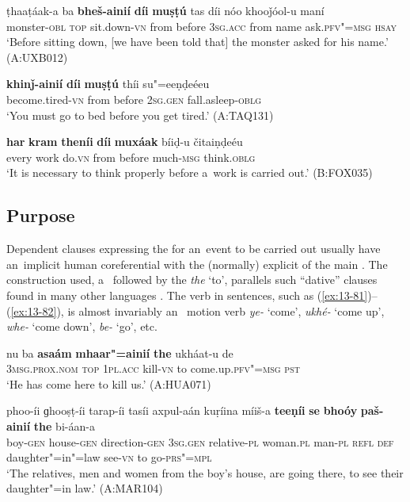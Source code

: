\ea
\label{ex:13-78}
\gll ṭhaaṭáak-a ba \textbf{bheš-ainií} \textbf{díi} \textbf{muṣṭú} tas díi nóo khooǰóol-u maní \\
monster-\textsc{obl} \textsc{top} sit.down-\textsc{vn} from before \textsc{3sg.acc} from name ask.\textsc{pfv"=msg} \textsc{hsay} \\
\glt `Before sitting down, [we have been told that] the monster asked for his name.' (A:UXB012)

\ex
\label{ex:13-79}
\gll \textbf{khinǰ-ainií} \textbf{díi} \textbf{muṣṭú} thíi su"=eeṇḍeéeu  \\
become.tired-\textsc{vn} from before \textsc{2sg.gen} fall.asleep-\textsc{oblg} \\
\glt `You must go to bed before you get tired.' (A:TAQ131)

\ex
\label{ex:13-80}
\gll \textbf{har} \textbf{kram} \textbf{theníi} \textbf{díi} \textbf{muxáak} bíiḍ-u čitaiṇḍeéu  \\
every work do.\textsc{vn} from before much-\textsc{msg} think.\textsc{oblg} \\
\glt `It is necessary to think properly before a~work is carried out.' (B:FOX035)
\z

\subsection{Purpose}
\label{subsec:13-4-2}

Dependent clauses expressing the  for an~event to be carried out usually have an~implicit human  coreferential with the (normally) explicit  of the main  \citep[337]{givon2001b}. The construction used, a~ followed by the  \textit{the} `to', parallels such ``dative''  clauses found in many other languages \citep[251--252]{thompsonetal2007}. The  verb in sentences, such as (\ref{ex:13-81})--(\ref{ex:13-82}), is almost invariably an~ motion verb \textit{ye-} `come', \textit{ukhé-} `come up', \textit{whe-} `come down', \textit{be-} `go', etc.

\begin{exe}
\ex
\label{ex:13-81}
\gll nu ba \textbf{asaám} \textbf{mhaar"=ainií} \textbf{the} ukháat-u de\\
\textsc{3msg.prox.nom} \textsc{top} \textsc{1pl.acc} kill-\textsc{vn} to come.up.\textsc{pfv"=msg} \textsc{pst}\\
\glt `He has come here to kill us.' (A:HUA071)

\ex
\label{ex:13-82}
\gll phoo-íi ɡhooṣṭ-íi tarap-íi tasíi axpul-aán kuṛíina míiš-a \textbf{teeṇíi} \textbf{se} \textbf{bhoóy} \textbf{paš-ainií} \textbf{the} bi-áan-a \\
boy-\textsc{gen} house-\textsc{gen} direction-\textsc{gen} \textsc{3sg.gen} relative-\textsc{pl} woman.\textsc{pl}  man-\textsc{pl} \textsc{refl} \textsc{def} daughter"=in"=law see-\textsc{vn} to go-\textsc{prs"=mpl} \\
\glt `The relatives, men and women from the boy's house, are going there, to see their daughter"=in law.' (A:MAR104) 
\end{exe}

